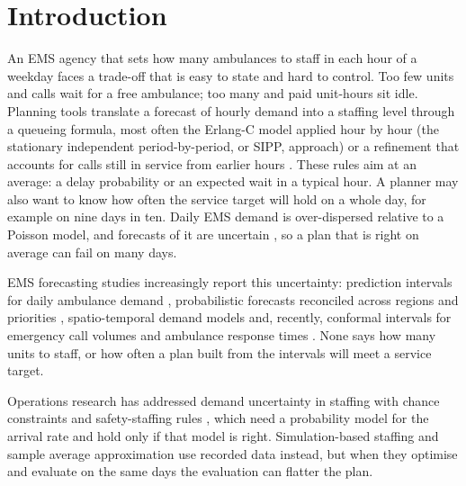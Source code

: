 \documentclass[11pt]{article}
\begin{document}
\section{Introduction}

An EMS agency that sets how many ambulances to staff in each hour of a weekday faces a trade-off that is easy to state and hard to control. Too few units and calls wait for a free ambulance; too many and paid unit-hours sit idle. Planning tools translate a forecast of hourly demand into a staffing level through a queueing formula, most often the Erlang-C model applied hour by hour (the stationary independent period-by-period, or SIPP, approach) or a refinement that accounts for calls still in service from earlier hours \citep{green2001improving,jennings1996server,green2007coping,feldman2008staffing,defraeye2016staffing}. These rules aim at an average: a delay probability or an expected wait in a typical hour. A planner may also want to know how often the service target will hold on a whole day, for example on nine days in ten. Daily EMS demand is over-dispersed relative to a Poisson model, and forecasts of it are uncertain \citep{channouf2007application,matteson2011forecasting,steckley2009forecast}, so a plan that is right on average can fail on many days.

EMS forecasting studies increasingly report this uncertainty: prediction intervals for daily ambulance demand \citep{monks2023forecasting}, probabilistic forecasts reconciled across regions and priorities \citep{rostamitabar2024hierarchical}, spatio-temporal demand models \citep{matteson2011forecasting,zhou2015spatio} and, recently, conformal intervals for emergency call volumes \citep{kara2026beyond} and ambulance response times \citep{mappouras2026process}. None says how many units to staff, or how often a plan built from the intervals will meet a service target.

Operations research has addressed demand uncertainty in staffing with chance constraints and safety-staffing rules \citep{gurvich2010staffing,bassamboo2010capacity,gans2015parametric}, which need a probability model for the arrival rate and hold only if that model is right. Simulation-based staffing \citep{atlason2004call} and sample average approximation \citep{kleywegt2002saa} use recorded data instead, but when they optimise and evaluate on the same days the evaluation can flatter the plan.
\end{document}
